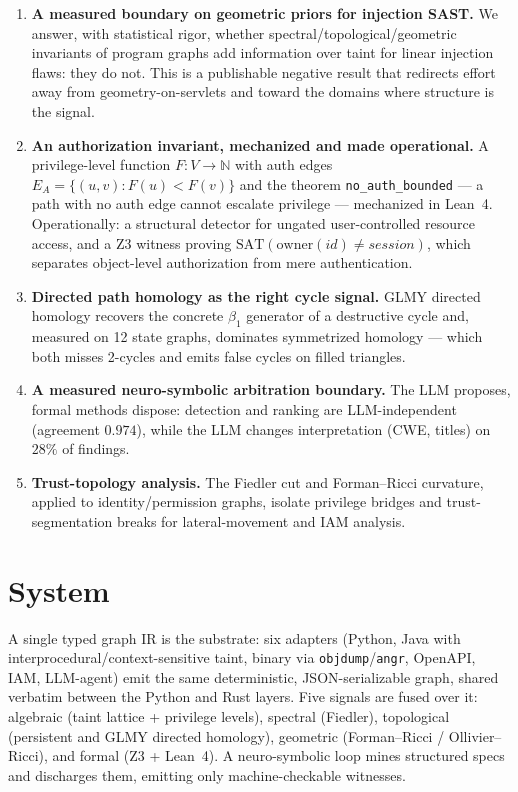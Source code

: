 \documentclass[11pt]{article}
\newcommand{\N}{\mathbb{N}}
\begin{document}
\begin{enumerate}[label=\textbf{C\arabic*.},leftmargin=3em]
\item \textbf{A measured boundary on geometric priors for injection SAST.}
We answer, with statistical rigor, whether spectral/topological/geometric
invariants of program graphs add information over taint for linear injection
flaws: they do not. This is a publishable negative result that redirects effort
away from geometry-on-servlets and toward the domains where structure is the
signal.

\item \textbf{An authorization invariant, mechanized and made operational.} A
privilege-level function $F:V\to\N$ with auth edges $E_A=\{(u,v):F(u)<F(v)\}$
and the theorem \texttt{no\_auth\_bounded} --- a path with no auth edge cannot
escalate privilege --- mechanized in Lean~4. Operationally: a structural detector
for ungated user-controlled resource access, and a Z3 witness proving
$\mathrm{SAT}(\mathrm{owner}(id)\neq session)$, which separates object-level
authorization from mere authentication.

\item \textbf{Directed path homology as the right cycle signal.} GLMY directed
homology recovers the concrete $\beta_1$ generator of a destructive cycle and,
measured on 12 state graphs, dominates symmetrized homology --- which both misses
2-cycles and emits false cycles on filled triangles.

\item \textbf{A measured neuro-symbolic arbitration boundary.} The LLM proposes,
formal methods dispose: detection and ranking are LLM-independent (agreement
$0.974$), while the LLM changes interpretation (CWE, titles) on $28\%$ of
findings.

\item \textbf{Trust-topology analysis.} The Fiedler cut and Forman--Ricci
curvature, applied to identity/permission graphs, isolate privilege bridges and
trust-segmentation breaks for lateral-movement and IAM analysis.
\end{enumerate}

\section{System}
A single typed graph IR is the substrate: six adapters (Python, Java with
interprocedural/context-sensitive taint, binary via \texttt{objdump}/\texttt{angr},
OpenAPI, IAM, LLM-agent) emit the same deterministic, JSON-serializable graph,
shared verbatim between the Python and Rust layers. Five signals are fused over
it: algebraic (taint lattice + privilege levels), spectral (Fiedler), topological
(persistent and GLMY directed homology), geometric (Forman--Ricci / Ollivier--Ricci),
and formal (Z3 + Lean~4). A neuro-symbolic loop mines structured specs and
discharges them, emitting only machine-checkable witnesses.
\end{document}
